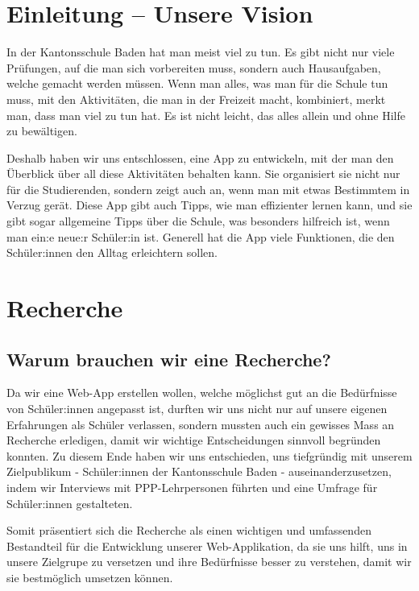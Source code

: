 \documentclass[12pt,a4paper]{report}
\begin{document}
\tableofcontents

\chapter{Einleitung – Unsere Vision}
In der Kantonsschule Baden hat man meist viel zu tun. Es gibt nicht nur viele Prüfungen, auf die man sich vorbereiten muss, sondern auch Hausaufgaben, welche gemacht werden müssen. Wenn man alles, was man für die Schule tun muss, mit den Aktivitäten, die man in der Freizeit macht, kombiniert, merkt man, dass man viel zu tun hat. Es ist nicht leicht, das alles allein und ohne Hilfe zu bewältigen.

Deshalb haben wir uns entschlossen, eine App zu entwickeln, mit der man den Überblick über all diese Aktivitäten behalten kann. Sie organisiert sie nicht nur für die Studierenden, sondern zeigt auch an, wenn man mit etwas Bestimmtem in Verzug gerät. Diese App gibt auch Tipps, wie man effizienter lernen kann, und sie gibt sogar allgemeine Tipps über die Schule, was besonders hilfreich ist, wenn man ein:e neue:r Schüler:in ist. Generell hat die App viele Funktionen, die den Schüler:innen den Alltag erleichtern sollen.

\chapter{Recherche}
\section{Warum brauchen wir eine Recherche?}
Da wir eine Web-App erstellen wollen, welche möglichst gut an die Bedürfnisse von Schüler:innen angepasst ist, durften wir uns nicht nur auf unsere eigenen Erfahrungen als Schüler verlassen, sondern mussten auch ein gewisses Mass an Recherche erledigen, damit wir wichtige Entscheidungen sinnvoll begründen konnten. 
Zu diesem Ende haben wir uns entschieden, uns tiefgründig mit unserem Zielpublikum - Schüler:innen der Kantonsschule Baden - auseinanderzusetzen, indem wir Interviews mit PPP-Lehrpersonen führten und eine Umfrage für Schüler:innen gestalteten.

Somit präsentiert sich die Recherche als einen wichtigen und umfassenden Bestandteil für die Entwicklung unserer Web-Applikation, da sie uns hilft, uns in unsere Zielgrupe zu versetzen und ihre Bedürfnisse besser zu verstehen, damit wir sie bestmöglich umsetzen können.
\end{document}
